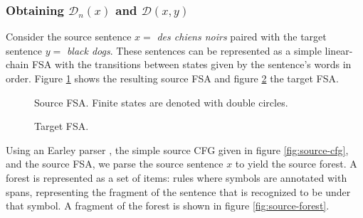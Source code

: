 \documentclass[11pt,a4paper]{article}
\begin{document}
\subsubsection{Obtaining $\mathcal{D}_{n}(x)$ and $\mathcal{D}(x,y)$}
\label{sec:fsa}
Consider the source sentence $x=$\textit{ des chiens noirs} paired with the target sentence $y=$\textit{ black dogs}. These sentences can be represented as a simple linear-chain FSA with the transitions between states given by the sentence's words in order. Figure \ref{fig:source-fsa} shows the resulting source FSA and figure \ref{fig:target-fsa} the target FSA.
\begin{figure}[H]
    \caption{Source FSA. Finite states are denoted with double circles.}
    \label{fig:source-fsa}
\end{figure}
\begin{figure}[H]
\center
    \caption{Target FSA.}
    \label{fig:target-fsa}
\end{figure}
Using an Earley parser \cite{earley}, the simple source CFG given in figure \ref{fig:source-cfg}, and the source FSA, we parse the source sentence $x$ to yield the source forest. A forest is represented as a set of items: rules where symbols are annotated with spans, representing the fragment of the sentence that is recognized to be under that symbol. A fragment of the forest is shown in figure \ref{fig:source-forest}.
\end{document}
